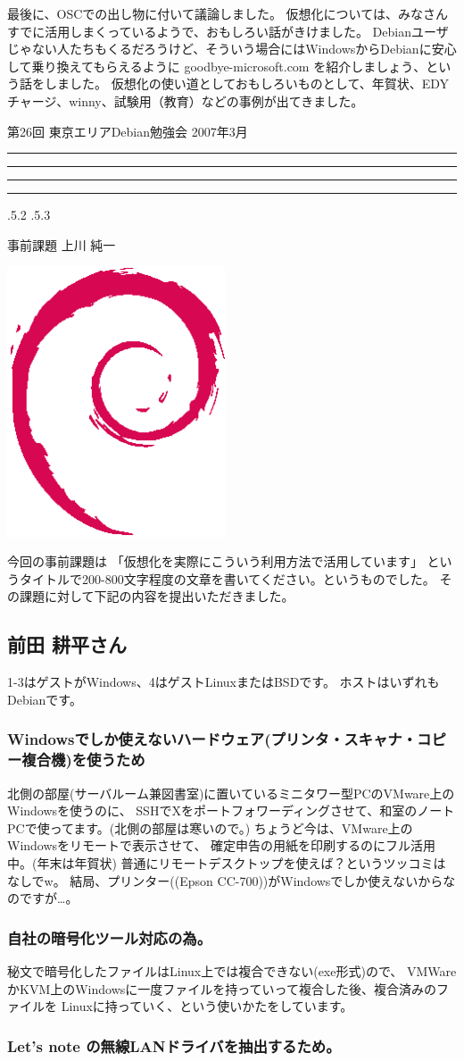 \documentclass[mingoth,a4paper]{jsarticle}
\makeatletter
\newcommand{\debmtgyear}{2007}
\newcommand{\debmtgmonth}{3}
\newcommand{\debmtgnumber}{26}
\renewcommand{\section}{\@startsection{section}{1}{\z@}%
    {\Cvs \@plus.5\Cdp \@minus.2\Cdp}%
    {.5\Cvs \@plus.3\Cdp}%
    {\normalfont\gt\fontsize{32}{32}\headfont\raggedright}} %
\newcommand{\dancersection}[2]{%
\newpage
第\debmtgnumber{}回 東京エリアDebian勉強会 \debmtgyear{}年\debmtgmonth{}月
\hrule
\vspace{0.5mm}
\hrule
%
\vspace{4cm}
\hrule
\vspace{0.5mm}
\hrule
%
\vspace{-7cm}
\begin{minipage}[b]{0.7\hsize}
\section{#1}
\hfill{}#2\\
\vspace{2cm}
\end{minipage}
\begin{minipage}[b]{0.3\hsize}
\hfill{}\includegraphics[height=8cm]{image200502/openlogo-nd.eps}\\
\end{minipage}
%
\vspace{-1cm}
}
\makeatother
\begin{document}
	  
	    最後に、OSCでの出し物に付いて議論しました。
	    仮想化については、みなさんすでに活用しまくっているようで、おもしろい話がきけました。
	    Debianユーザじゃない人たちもくるだろうけど、そういう場合にはWindowsからDebianに安心して乗り換えてもらえるように
	    goodbye-microsoft.com を紹介しましょう、という話をしました。
	    仮想化の使い道としておもしろいものとして、年賀状、EDYチャージ、winny、試験用（教育）などの事例が出てきました。
	  
\dancersection{事前課題}{上川 純一}

今回の事前課題は
「仮想化を実際にこういう利用方法で活用しています」
というタイトルで200-800文字程度の文章を書いてください。というものでした。
その課題に対して下記の内容を提出いただきました。

\subsection{前田 耕平さん}

1-3はゲストがWindows、4はゲストLinuxまたはBSDです。
ホストはいずれもDebianです。

\subsubsection{Windowsでしか使えないハードウェア(プリンタ・スキャナ・コピー複合機)を使うため}

北側の部屋(サーバルーム兼図書室)に置いているミニタワー型PCのVMware上のWindowsを使うのに、
SSHでXをポートフォワーディングさせて、和室のノートPCで使ってます。(北側の部屋は寒いので。)
ちょうど今は、VMware上のWindowsをリモートで表示させて、
確定申告の用紙を印刷するのにフル活用中。(年末は年賀状)
普通にリモートデスクトップを使えば？というツッコミはなしでw。
結局、プリンター((Epson CC-700))がWindowsでしか使えないからなのですが…。

\subsubsection{自社の暗号化ツール対応の為。}

秘文で暗号化したファイルはLinux上では複合できない(exe形式)ので、
VMWareかKVM上のWindowsに一度ファイルを持っていって複合した後、複合済みのファイルを
Linuxに持っていく、という使いかたをしています。


\subsubsection{Let's note の無線LANドライバを抽出するため。}
\end{document}
